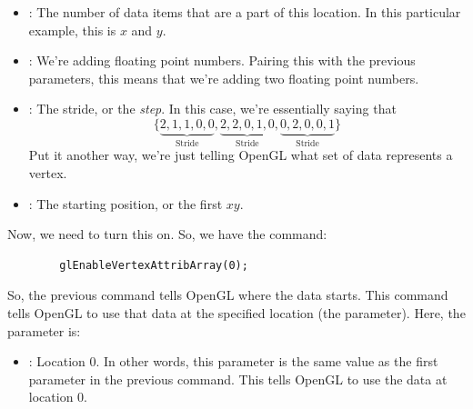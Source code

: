 \documentclass[letterpaper]{article}
\begin{document}
\begin{enumerate}
\begin{itemize}
        \item {}: The number of data items that are a part of this location. In this particular example, this is $x$ and $y$.
        \item {}: We're adding floating point numbers. Pairing this with the previous parameters, this means that we're adding two floating point numbers. 
        \item {}: The stride, or the \emph{step}. In this case, we're essentially saying that 
        \[\{\underbrace{2, 1, 1, 0, 0}_{\text{Stride}}, \underbrace{2, 2, 0, 1, 0}_{\text{Stride}}, \underbrace{0, 2, 0, 0, 1}_{\text{Stride}}\}\]
        Put it another way, we're just telling OpenGL what set of data represents a vertex.
        \item  {}: The starting position, or the first $xy$.
    \end{itemize}
    Now, we need to turn this on. So, we have the command: 
    \begin{verbatim}
        glEnableVertexAttribArray(0);
    \end{verbatim}
    So, the previous command tells OpenGL where the data starts. This command tells OpenGL to use that data at the specified location (the parameter). Here, the parameter is: 
    \begin{itemize}
        \item {}: Location 0. In other words, this parameter is the same value as the first parameter in the previous command. This tells OpenGL to use the data at location 0.
    \end{itemize}


\end{enumerate}
\end{document}
